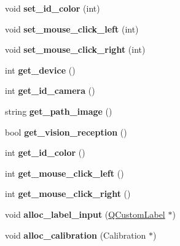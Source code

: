 \begin{DoxyCompactItemize}
\item 
void {\bfseries set\+\_\+id\+\_\+color} (int)\hypertarget{classcalibration_a6e2c50598a4f5d49c6d7bda23b69ddf3}{}\label{classcalibration_a6e2c50598a4f5d49c6d7bda23b69ddf3}

\item 
void {\bfseries set\+\_\+mouse\+\_\+click\+\_\+left} (int)\hypertarget{classcalibration_aaaf40baef708cb370c468ea0799ffaf6}{}\label{classcalibration_aaaf40baef708cb370c468ea0799ffaf6}

\item 
void {\bfseries set\+\_\+mouse\+\_\+click\+\_\+right} (int)\hypertarget{classcalibration_a788f9207f8641b1c3d3a74760e636bb3}{}\label{classcalibration_a788f9207f8641b1c3d3a74760e636bb3}

\item 
int {\bfseries get\+\_\+device} ()\hypertarget{classcalibration_a4c62df2cfea03276dde05134fd234b2c}{}\label{classcalibration_a4c62df2cfea03276dde05134fd234b2c}

\item 
int {\bfseries get\+\_\+id\+\_\+camera} ()\hypertarget{classcalibration_a94b344ed8858fcb8509ba313d101d9c2}{}\label{classcalibration_a94b344ed8858fcb8509ba313d101d9c2}

\item 
string {\bfseries get\+\_\+path\+\_\+image} ()\hypertarget{classcalibration_aa607fee8c37d34cf3d812063ca7fb626}{}\label{classcalibration_aa607fee8c37d34cf3d812063ca7fb626}

\item 
bool {\bfseries get\+\_\+vision\+\_\+reception} ()\hypertarget{classcalibration_a567ceb5a68243624b3240955fdbfc50e}{}\label{classcalibration_a567ceb5a68243624b3240955fdbfc50e}

\item 
int {\bfseries get\+\_\+id\+\_\+color} ()\hypertarget{classcalibration_a284e8a7b65d67601bd8d7bef949524df}{}\label{classcalibration_a284e8a7b65d67601bd8d7bef949524df}

\item 
int {\bfseries get\+\_\+mouse\+\_\+click\+\_\+left} ()\hypertarget{classcalibration_a45d0e76b3f360c7b198166cf7ccc638d}{}\label{classcalibration_a45d0e76b3f360c7b198166cf7ccc638d}

\item 
int {\bfseries get\+\_\+mouse\+\_\+click\+\_\+right} ()\hypertarget{classcalibration_a8053c43e483faf127e20e16ff4ee6d8a}{}\label{classcalibration_a8053c43e483faf127e20e16ff4ee6d8a}

\item 
void {\bfseries alloc\+\_\+label\+\_\+input} (\hyperlink{classQCustomLabel}{Q\+Custom\+Label} $\ast$)\hypertarget{classcalibration_ab0b5f5514c665852aa63830121622518}{}\label{classcalibration_ab0b5f5514c665852aa63830121622518}

\item 
void {\bfseries alloc\+\_\+calibration} (Calibration $\ast$)\hypertarget{classcalibration_ac5e4cd1cead7176b0f34586112aaa918}{}\label{classcalibration_ac5e4cd1cead7176b0f34586112aaa918}

\end{DoxyCompactItemize}
